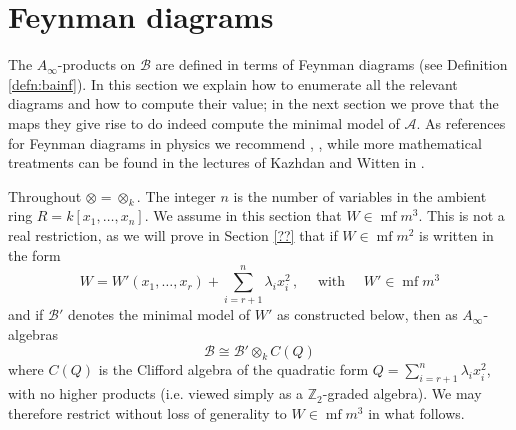\documentclass[english,letter paper,12pt,leqno]{article}
\theoremstyle{example}
\numberwithin{equation}{section}
\def\be{\begin{equation}}
\def\ee{\end{equation}}
\def\nZ{\mathds{Z}}
\DeclareMathOperator{\mf}{mf}
\begin{document}
\section{Feynman diagrams}

The $A_\infty$-products on $\mathscr{B}$ are defined in terms of Feynman diagrams (see Definition \ref{defn:bainf}). In this section we explain how to enumerate all the relevant diagrams and how to compute their value; in the next section we prove that the maps they give rise to do indeed compute the minimal model of $\mathscr{A}$. As references for Feynman diagrams in physics we recommend \cite[Ch. 6]{weinberg}, \cite[\S 4.4]{ps}, while more mathematical treatments can be found in the lectures of Kazhdan and Witten in \cite{qftstring}.

Throughout $\otimes = \otimes_k$. The integer $n$ is the number of variables in the ambient ring $R = k[x_1,\ldots,x_n]$. We assume in this section that $W \in \mf{m}^3$. This is not a real restriction, as we will prove in Section \ref{??} that if $W \in \mf{m}^2$ is written in the form
\be
W = W'(x_1,\ldots,x_r) + \sum_{i={r+1}}^n \lambda_i x_i^2\,, \quad \text{ with } \quad W' \in \mf{m}^3
\ee
and if $\mathscr{B}'$ denotes the minimal model of $W'$ as constructed below, then as $A_\infty$-algebras
\be
\mathscr{B} \cong \mathscr{B}' \otimes_k C( Q )
\ee
where $C(Q)$ is the Clifford algebra of the quadratic form $Q = \sum_{i=r+1}^n \lambda_i x_i^2$, with no higher products (i.e. viewed simply as a $\nZ_2$-graded algebra). We may therefore restrict without loss of generality to $W \in \mf{m}^3$ in what follows.
\end{document}
